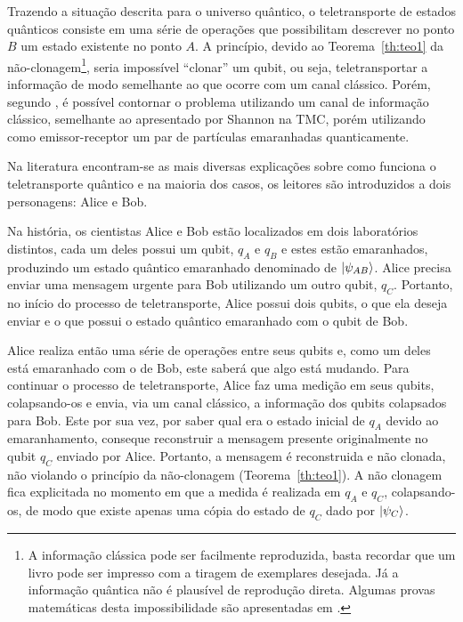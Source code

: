 \documentclass[11pt,oneside,brazil,hidelinks,article,sumario=tradicional,a4paper]{abntex2}
\begin{document}
Trazendo a situação descrita para o universo quântico, o teletransporte de estados quânticos consiste em uma série de operações que possibilitam descrever no ponto \(B\) um estado existente no ponto \(A\). A princípio, devido ao Teorema~\ref{th:teo1} da não-clonagem\footnote{A informação clássica pode ser facilmente reproduzida, basta recordar que um livro pode ser impresso com a tiragem de exemplares desejada. Já a informação quântica não é plausível de reprodução direta. Algumas provas matemáticas desta impossibilidade são apresentadas em \textcite{TeoQuanInfoEntreCopia}.}, seria impossível ``clonar'' um qubit, ou seja, teletransportar a informação de modo semelhante ao que ocorre com um canal clássico. Porém, segundo \textcite{bennet}, é possível contornar o problema utilizando um canal de informação clássico, semelhante ao apresentado por Shannon na TMC, porém utilizando como emissor-receptor um par de partículas emaranhadas quanticamente.

Na literatura encontram-se as mais diversas explicações sobre como funciona o teletransporte quântico \cites{bennet}{experimentalqt}{zeilinger}{brassard1996teleportation}{materialdidaticomecquantica} e na maioria dos casos, os leitores são introduzidos a dois personagens: Alice e Bob.

Na história, os cientistas Alice e Bob estão localizados em dois laboratórios distintos, cada um deles possui um qubit, $q_{A}$ e $q_{B}$ e estes estão emaranhados, produzindo um estado quântico emaranhado denominado de $\ket{\psi_{AB}}$. Alice precisa enviar uma mensagem urgente para Bob utilizando um outro qubit, $q_{C}$. Portanto, no início do processo de teletransporte, Alice possui dois qubits, o que ela deseja enviar e o que possui o estado quântico emaranhado com o qubit de Bob.

Alice realiza então uma série de operações entre seus qubits e, como um deles está emaranhado com o de Bob, este saberá que algo está mudando. Para continuar o processo de teletransporte, Alice faz uma medição em seus qubits, colapsando-os e envia, via um canal clássico, a informação dos qubits colapsados para Bob. Este por sua vez, por saber qual era o estado inicial de $q_{A}$ devido ao emaranhamento, conseque reconstruir a mensagem presente originalmente no qubit $q_{C}$ enviado por Alice. Portanto, a mensagem é reconstruida e não clonada, não violando o princípio da não-clonagem (Teorema~\ref{th:teo1}). A não clonagem fica explicitada no momento em que a medida é realizada em $q_{A}$ e $q_{C}$, colapsando-os, de modo que existe apenas uma cópia do estado de $q_{C}$ dado por $\ket{\psi_{C}}$.
\end{document}
